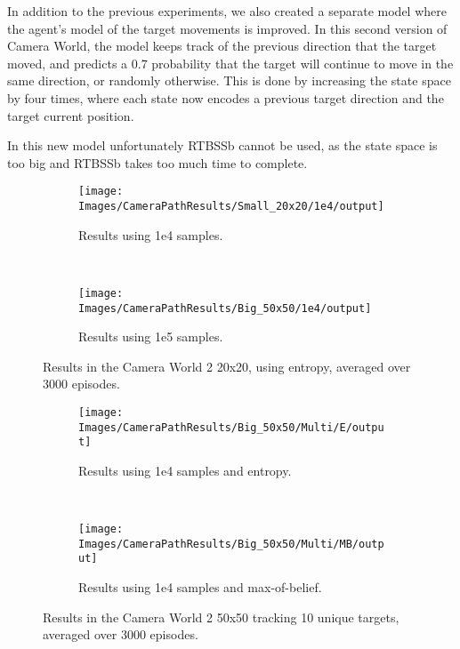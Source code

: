 In addition to the previous experiments, we also created a separate model where the agent's model of
the target movements is improved. In this second version of Camera World, the model keeps track of
the previous direction that the target moved, and predicts a $0.7$ probability that the target will
continue to move in the same direction, or randomly otherwise. This is done by increasing the state
space by four times, where each state now encodes a previous target direction and the target current
position.

In this new model unfortunately RTBSSb cannot be used, as the state space is too big and RTBSSb
takes too much time to complete.

\begin{figure}[ht!]
        \centering
        \begin{subfigure}[t]{0.45\textwidth}
                \texttt{[image: Images/CameraPathResults/Small\_20x20/1e4/output]}
                \caption{Results using 1e4 samples.}
                \label{fig:cps4e}
        \end{subfigure}%
        ~ %
        \begin{subfigure}[t]{0.45\textwidth}
                \texttt{[image: Images/CameraPathResults/Big\_50x50/1e4/output]}
                \caption{Results using 1e5 samples.}
                \label{fig:cps5e}
        \end{subfigure}
        \caption{Results in the Camera World 2 20x20, using entropy, averaged over 3000 episodes.}\label{fig:cpse}
\end{figure}

\begin{figure}[ht]
        \centering
        \begin{subfigure}[t]{0.5\textwidth}
                \texttt{[image: Images/CameraPathResults/Big\_50x50/Multi/E/output]}
                \caption{Results using 1e4 samples and entropy.}
                \label{fig:cpb4e10}
        \end{subfigure}%
        ~ %
        \begin{subfigure}[t]{0.5\textwidth}
                \texttt{[image: Images/CameraPathResults/Big\_50x50/Multi/MB/output]}
                \caption{Results using 1e4 samples and max-of-belief.}
                \label{fig:cpb5mb10}
        \end{subfigure}
        \caption{Results in the Camera World 2 50x50 tracking 10 unique targets, averaged over 3000 episodes.}\label{fig:cpb10}
\end{figure}
